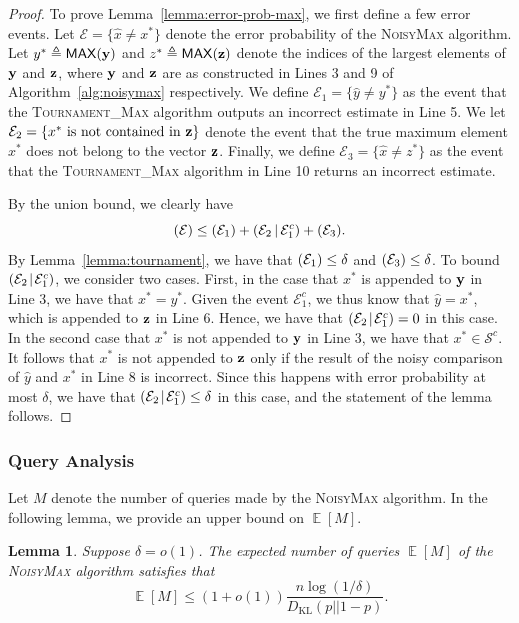 \documentclass[journal, onecolumn]{IEEEtran}
\theoremstyle{plain}
\newtheorem{lemma}[theorem]{Lemma}
\theoremstyle{definition}
\theoremstyle{remark}
\def\cs{{\mathcal S}}
\def\ce{{\mathcal E}}
\DeclareMathOperator\E{\mathbb{E}}
\let\P\relax
\DeclareMathOperator\P{\mathsf{P}}
\newcommand{\cond}{\mathchoice{\,\vert\,}{\mspace{2mu}\vert\mspace{2mu}}{\vert}{\vert}}
\newcommand{\stourmax}{\textsc{Tournament\_Max }}
\begin{document}
\begin{proof}
To prove Lemma~\ref{lemma:error-prob-max}, we first define a few error events. Let $\ce=\{\hat{x}\neq x^*\}$ denote the error probability of the \textsc{NoisyMax} algorithm. Let $y^{*} \triangleq \mathsf{MAX}({\bf y})$ and $z^{*} \triangleq \mathsf{MAX}({\bf z})$ denote the indices of the largest elements of ${\bf y}$ and ${\bf z}$, where ${\bf y}$ and ${\bf z}$ are as constructed in Lines 3 and 9 of Algorithm~\ref{alg:noisymax} respectively. We define $\ce_1=\{\hat{y}\neq y^{*}\}$ as the event that the \stourmax algorithm outputs an incorrect estimate in Line 5. We let $\ce_2=\{x^* \text{ is not contained in } {\bf z}\}$ denote the event that the true maximum element $x^*$ does not belong to the vector ${\bf z}$. Finally, we define $\ce_3 = \{\hat{x} \neq z^{*}\}$ as the event that the \stourmax algorithm in Line 10 returns an incorrect estimate. 

By the union bound, we clearly have
\[
\P(\ce) \leq \P(\ce_1) + \P(\ce_2 \cond \ce_1^c) + \P(\ce_3).
\]
By Lemma~\ref{lemma:tournament}, we have that $\P(\ce_1) \leq \delta$ and $\P(\ce_3) \leq \delta$. To bound $\P(\ce_2 \cond \ce_1^c)$, we consider two cases. First, in the case that $x^*$ is appended to ${\bf y}$ in Line 3, we have that $x^* = y^*$. Given the event $\ce_1^c$, we thus know that $\hat{y} = x^*$, which is appended to ${\bf z}$ in Line 6. Hence, we have that $\P(\ce_2 \cond \ce_1^c) = 0$ in this case. In the second case that $x^*$ is not appended to ${\bf y}$ in Line 3, we have that $x^* \in \cs^c$. It follows that $x^*$ is not appended to ${\bf z}$ only if the result of the noisy comparison of $\hat{y}$ and $x^*$ in Line 8 is incorrect. Since this happens with error probability at most $\delta$, we have that $\P(\ce_2 \cond \ce_1^c) \leq \delta$ in this case, and the statement of the lemma follows.
\end{proof}


\vspace{0.5em}
\subsubsection{Query Analysis}
Let $M$ denote the number of queries made by the \textsc{NoisyMax} algorithm. In the following lemma, we provide an upper bound on $\E[M]$.

\begin{lemma} \label{lemma:number-queries-max}
    Suppose $\delta=o(1)$. The expected number of queries $\E[M]$ of the \textsc{NoisyMax} algorithm satisfies that
    \[
        \E[M]\leq (1+o(1))\frac{n\log(1/\delta)}{D_\mathrm{KL}(p||1-p)}.
    \]
\end{lemma}
\end{document}
